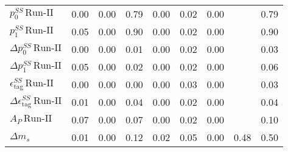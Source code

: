 \begin{tabular}{l  c  c  c  c  c  c  c  | c }
$p_{0}^{SS} \, \text{Run-II}$ & 0.00 & 0.00 & 0.79 & 0.00 & 0.02 & 0.00 &  & 0.79 \\ 
$p_{1}^{SS} \, \text{Run-II}$ & 0.05 & 0.00 & 0.90 & 0.00 & 0.02 & 0.00 &  & 0.90 \\ 
$\Delta p_{0}^{SS} \, \text{Run-II}$ & 0.00 & 0.00 & 0.01 & 0.00 & 0.02 & 0.00 &  & 0.03 \\ 
$\Delta p_{1}^{SS} \, \text{Run-II}$ & 0.05 & 0.00 & 0.02 & 0.00 & 0.02 & 0.00 &  & 0.06 \\ 
$\epsilon_{\text{tag}}^{SS} \, \text{Run-II}$ & 0.00 & 0.00 & 0.00 & 0.00 & 0.03 & 0.00 &  & 0.03 \\ 
$\Delta \epsilon_{\text{tag}}^{SS} \, \text{Run-II}$ & 0.01 & 0.00 & 0.04 & 0.00 & 0.02 & 0.00 &  & 0.04 \\ 
$A_{P} \, \text{Run-II}$ & 0.07 & 0.00 & 0.07 & 0.00 & 0.02 & 0.00 &  & 0.10 \\ 
$\Delta m_{s}$ & 0.01 & 0.00 & 0.12 & 0.02 & 0.05 & 0.00 & 0.48 & 0.50 \\ 
\hline
\hline
\end{tabular}
